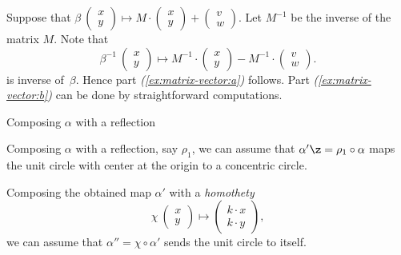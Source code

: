  Suppose that $\beta\:\left(\begin{smallmatrix}
x\\ y
\end{smallmatrix} \right)
  \mapsto
  M
  \cdot
  \left(\begin{smallmatrix}
x\\ y
\end{smallmatrix} \right)
  +
\left(\begin{smallmatrix}
v\\ w
\end{smallmatrix} \right)$.
Let $M^{-1}$ be the inverse of the matrix $M$.
Note that
\[\beta^{-1}\:\left(\begin{smallmatrix}
x\\ y
\end{smallmatrix} \right)
\mapsto
M^{-1}
\cdot
(\begin{smallmatrix}
x\\ y
\end{smallmatrix} )
-M^{-1}
\cdot
(\begin{smallmatrix}
v\\ w
\end{smallmatrix}).
\] 
is inverse of~$\beta$.
Hence part \textit{(\ref{ex:matrix-vector:a})} follows.
Part \textit{(\ref{ex:matrix-vector:b})} can be done by straightforward computations.
















Composing $\alpha$ with a reflection

Composing $\alpha$ with a reflection, say $\rho_1$, we can assume that $\alpha'\z=\rho_1\circ\alpha$ maps the unit circle with center at the origin to a concentric circle. 


Composing the obtained map $\alpha'$ with a {}\emph{homothety} 
\[\chi\:\left(\begin{smallmatrix}
x\\ y
\end{smallmatrix} \right)\mapsto \left(\begin{smallmatrix}
k\cdot x\\ k\cdot y
\end{smallmatrix} \right),\]
we can assume that $\alpha''=\chi\circ\alpha'$ sends the unit circle to itself.



